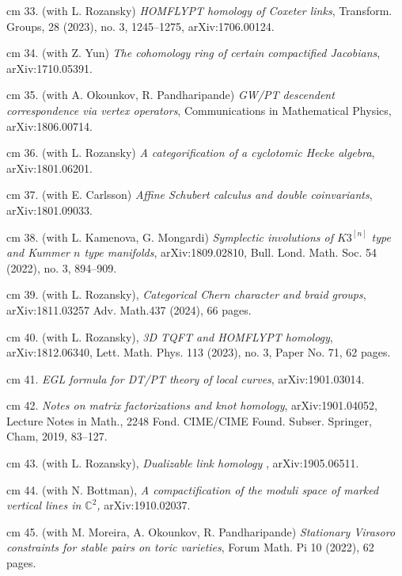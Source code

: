 \documentclass[11pt]{amsart}
\theoremstyle{plain}
\theoremstyle{definition}
\theoremstyle{remark}
\begin{document}
\noindent{} cm 33. (with L. Rozansky) {\it HOMFLYPT homology of Coxeter links}, Transform. Groups, 28 (2023), no. 3, 1245--1275,
arXiv:1706.00124.




\noindent{} cm 34. (with  Z. Yun) {\it The cohomology ring of certain compactified Jacobians},  arXiv:1710.05391. 


\noindent{} cm 35. (with A. Okounkov, R. Pandharipande) {\it  GW/PT descendent correspondence via vertex operators}, Communications in Mathematical Physics, arXiv:1806.00714.



\noindent{} cm 36. (with L. Rozansky)
{\it A categorification of a cyclotomic Hecke algebra}, arXiv:1801.06201.

\noindent{} cm 37. (with E. Carlsson)
{\it Affine Schubert calculus and double coinvariants}, arXiv:1801.09033.

\noindent{} cm 38. (with L. Kamenova, G. Mongardi) {\it Symplectic involutions of \(K3^{[n]}\) type and Kummer \(n\)
  type manifolds}, arXiv:1809.02810, Bull. Lond. Math. Soc. 54 (2022), no. 3, 894--909.

\noindent{} cm 39. (with L. Rozansky), {\it Categorical Chern character and braid groups},   arXiv:1811.03257 Adv. Math.437 (2024), 66 pages.

\noindent{} cm 40. (with L. Rozansky), {\it 3D TQFT and HOMFLYPT homology},  arXiv:1812.06340, Lett. Math. Phys. 113 (2023), no. 3, Paper No. 71, 62 pages.

\noindent{} cm 41. {\it EGL formula for DT/PT theory of local curves}, arXiv:1901.03014.

\noindent{} cm 42. {\it Notes on matrix factorizations and knot homology}, arXiv:1901.04052, Lecture Notes in Math., 2248
Fond. CIME/CIME Found. Subser.
Springer, Cham, 2019, 83--127.

\noindent{} cm 43. (with L. Rozansky), {\it Dualizable link homology }, arXiv:1905.06511.

\noindent{} cm 44. (with N. Bottman), {\it 
A compactification of the moduli space of marked vertical lines in $\mathbb{C}^2$, } arXiv:1910.02037.



\noindent{} cm 45. (with M. Moreira, A. Okounkov, R. Pandharipande)
{\it  Stationary Virasoro constraints for stable pairs on toric varieties}, Forum Math. Pi 10 (2022), 62 pages.
\end{document}
